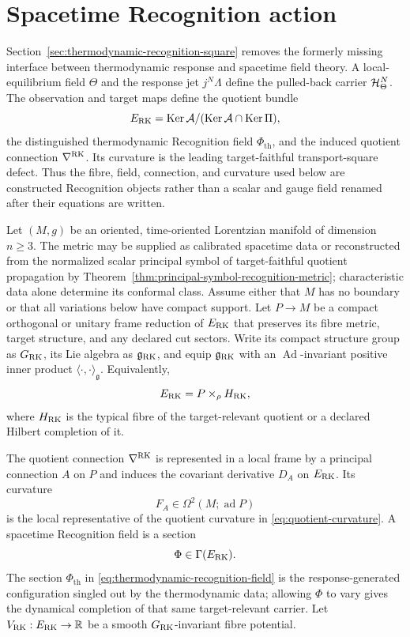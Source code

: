 \section{Spacetime Recognition action}
\label{sec:spacetime-action}

Section~\ref{sec:thermodynamic-recognition-square} removes the formerly missing interface between thermodynamic response and spacetime field theory.  A local-equilibrium field $\Theta$ and the response jet $j^N\Lambda$ define the pulled-back carrier $\mathcal H^N_\Theta$.  The observation and target maps define the quotient bundle
\[
E_{\mathrm{RK}}=\operatorname{Ker}\mathcal A/(\operatorname{Ker}\mathcal A\cap\operatorname{Ker}\Pi),
\]
the distinguished thermodynamic Recognition field $\Phi_{\mathrm{th}}$, and the induced quotient connection $\nabla^{\mathrm{RK}}$.  Its curvature is the leading target-faithful transport-square defect.  Thus the fibre, field, connection, and curvature used below are constructed Recognition objects rather than a scalar and gauge field renamed after their equations are written.

Let $(M,g)$ be an oriented, time-oriented Lorentzian manifold of dimension $n\ge3$.  The metric may be supplied as calibrated spacetime data or reconstructed from the normalized scalar principal symbol of target-faithful quotient propagation by Theorem~\ref{thm:principal-symbol-recognition-metric}; characteristic data alone determine its conformal class.  Assume either that $M$ has no boundary or that all variations below have compact support.  Let $P\to M$ be a compact orthogonal or unitary frame reduction of $E_{\mathrm{RK}}$ that preserves its fibre metric, target structure, and any declared cut sectors.  Write its compact structure group as $G_{\mathrm{RK}}$, its Lie algebra as $\mathfrak g_{\mathrm{RK}}$, and equip $\mathfrak g_{\mathrm{RK}}$ with an $\operatorname{Ad}$-invariant positive inner product $\langle\cdot,\cdot\rangle_{\mathfrak g}$.  Equivalently,
\[
E_{\mathrm{RK}}=P\times_\rho H_{\mathrm{RK}},
\]
where $H_{\mathrm{RK}}$ is the typical fibre of the target-relevant quotient or a declared Hilbert completion of it.

The quotient connection $\nabla^{\mathrm{RK}}$ is represented in a local frame by a principal connection $A$ on $P$ and induces the covariant derivative $D_A$ on $E_{\mathrm{RK}}$.  Its curvature
\[
F_A\in\Omega^2(M;\operatorname{ad}P)
\]
is the local representative of the quotient curvature in \eqref{eq:quotient-curvature}.  A spacetime Recognition field is a section
\[
\Phi\in\Gamma(E_{\mathrm{RK}}).
\]
The section $\Phi_{\mathrm{th}}$ in \eqref{eq:thermodynamic-recognition-field} is the response-generated configuration singled out by the thermodynamic data; allowing $\Phi$ to vary gives the dynamical completion of that same target-relevant carrier.  Let $V_{\mathrm{RK}}:E_{\mathrm{RK}}\to\mathbb R$ be a smooth $G_{\mathrm{RK}}$-invariant fibre potential.

